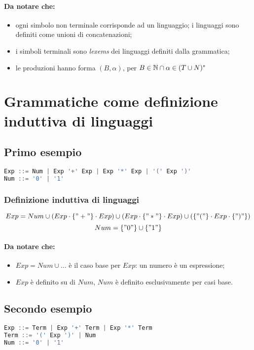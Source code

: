\paragraph{Da notare che:}
\begin{itemize}
  \item ogni simbolo non terminale corrisponde ad un linguaggio; i linguaggi
    sono definiti come unioni di concatenazioni;
  \item i simboli terminali sono \emph{lexems} dei linguaggi definiti dalla
    grammatica;
  \item le produzioni hanno forma $(B,\alpha)$, per $B\in\mathbb{N}\cap\alpha\in
    (T\cup N)^*$
\end{itemize}

\section{Grammatiche come definizione induttiva di linguaggi}
\subsection{Primo esempio}
\begin{lstlisting}[language=Java, caption={Esempio}]
Exp ::= Num | Exp '+' Exp | Exp '*' Exp | '(' Exp ')'
Num ::= '0' | '1'
\end{lstlisting}

\subsubsection{Definizione induttiva di linguaggi}
\[
  Exp=Num\cup(Exp\cdot\{"+"\}\cdot Exp)\cup(Exp\cdot\{"*"\}\cdot Exp)\cup(\{"("
  \}\cdot Exp\cdot\{")"\})
\]
\[
  Num=\{"0"\}\cup\{"1"\}
\]

\paragraph{Da notare che:}
\begin{itemize}
  \item $Exp=Num\cup\dots$ è il caso base per $Exp$: un numero è un
    espressione;
  \item $Exp$ è definito su di $Num$, $Num$ è definito esclusivamente per casi
    base.
\end{itemize}

\subsection{Secondo esempio}
\begin{lstlisting}[language=Java, caption={Esempio}]
Exp ::= Term | Exp '+' Term | Exp '*' Term
Term ::= '(' Exp ')' | Num
Num ::= '0' | '1'
\end{lstlisting}

